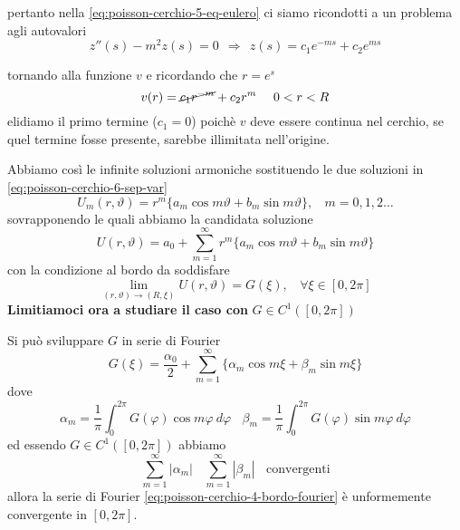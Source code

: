 \begin{dimostrazione}
\begin{enumerate}
              pertanto nella \eqref{eq:poisson-cerchio-5-eq-eulero} ci siamo ricondotti a un problema agli autovalori
              \begin{equation*}
                  z''(s) -m^{2} z(s) =0\ \ \Rightarrow \ \ z(s) =c_{1} e^{-ms} +c_{2} e^{ms}
              \end{equation*}

              tornando alla funzione $v$ e ricordando che $r=e^{s}$
              \begin{equation*}
                  v(r) =\cancel{c_{1} r^{-m}} +c_{2} r^{m} \ \ \ \ 0< r< R
              \end{equation*}elidiamo il primo termine ($c_{1}=0$) poichè $v$ deve essere continua nel cerchio, se quel termine fosse presente, sarebbe illimitata nell'origine.
    \end{enumerate}

    Abbiamo così le infinite soluzioni armoniche sostituendo le due soluzioni in \eqref{eq:poisson-cerchio-6-sep-var}
    \begin{equation*}
        U_{m}(r,\vartheta) =r^{m}\{a_{m}\cos m\vartheta +b_{m}\sin m\vartheta \},\ \ \ \ m=0,1,2\dotsc
    \end{equation*}
    sovrapponendo le quali abbiamo la candidata soluzione
    \begin{equation}
        U(r,\vartheta) =a_{0} +\sum\limits ^{\infty }_{m=1} r^{m}\{a_{m}\cos m\vartheta +b_{m}\sin m\vartheta \}
        \label{eq:poisson-cerchio-3-candidata}
    \end{equation}
    con la condizione al bordo da soddisfare
    \begin{equation}
        \lim _{(r,\vartheta)\rightarrow (R,\xi)} U(r,\vartheta) =G(\xi),\ \ \ \ \forall \xi \in [ 0,2\pi ]
        \label{eq:poisson-cerchio-2-condizione}
    \end{equation}
    \textbf{Limitiamoci ora a studiare il caso con }$G\in C^{1}([ 0,2\pi ])$

    Si può sviluppare $G$ in serie di Fourier
    \begin{equation}
        G(\xi) =\frac{\alpha _{0}}{2} +\sum\limits ^{\infty }_{m=1}\{\alpha _{m}\cos m\xi +\beta _{m}\sin m\xi \} \tag{F}
        \label{eq:poisson-cerchio-4-bordo-fourier}
    \end{equation}
    dove
    \begin{equation*}
        \alpha _{m} =\frac{1}{\pi }\int ^{2\pi }_{0} G(\varphi)\cos m\varphi \ d\varphi \ \ \ \ \beta _{m} =\frac{1}{\pi }\int ^{2\pi }_{0} G(\varphi)\sin m\varphi \ d\varphi
    \end{equation*}
    ed essendo $G\in C^{1}([ 0,2\pi ])$ abbiamo
    \begin{equation*}
        \sum\limits ^{\infty }_{m=1}| \alpha _{m}| \ \ \ \ \sum\limits ^{\infty }_{m=1}| \beta _{m}| \ \ \ \ \text{convergenti}
    \end{equation*}
    allora la serie di Fourier \eqref{eq:poisson-cerchio-4-bordo-fourier} è unformemente convergente in $[ 0,2\pi ]$.


\end{dimostrazione}
